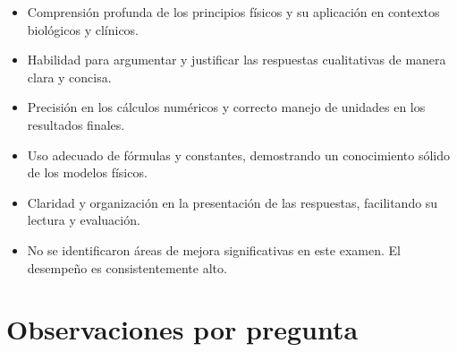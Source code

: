 \documentclass[11pt,a4paper]{article}
\begin{document}
\vspace{4pt}
\begin{minipage}[t]{0.48\linewidth}
  \begin{tcolorbox}[cajaFortaleza, title={Fortalezas}]
\begin{itemize}[leftmargin=1.5em, itemsep=2pt]
  \item Comprensión profunda de los principios físicos y su aplicación en contextos biológicos y clínicos.
  \item Habilidad para argumentar y justificar las respuestas cualitativas de manera clara y concisa.
  \item Precisión en los cálculos numéricos y correcto manejo de unidades en los resultados finales.
  \item Uso adecuado de fórmulas y constantes, demostrando un conocimiento sólido de los modelos físicos.
  \item Claridad y organización en la presentación de las respuestas, facilitando su lectura y evaluación.
\end{itemize}
  \end{tcolorbox}
\end{minipage}
\hfill
\begin{minipage}[t]{0.48\linewidth}
  \begin{tcolorbox}[cajaMejora, title={Areas de mejora}]
\begin{itemize}[leftmargin=1.5em, itemsep=2pt]
  \item No se identificaron áreas de mejora significativas en este examen. El desempeño es consistentemente alto.
\end{itemize}
  \end{tcolorbox}
\end{minipage}

\section*{Observaciones por pregunta}
\end{document}
